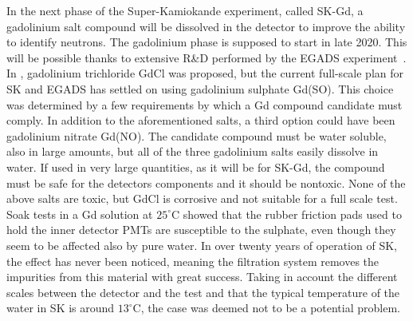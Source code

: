 In the next phase of the Super-Kamiokande experiment, called SK-Gd, a gadolinium salt compound %
will be dissolved in the detector to improve the ability to identify neutrons.
The gadolinium phase is supposed to start in late 2020.
This will be possible thanks to extensive R\&D performed by the EGADS experiment~\cite{Ikeda:2019pcm}.
In , gadolinium trichloride GdCl was proposed, %
but the current full-scale plan for SK and EGADS has settled on using gadolinium sulphate Gd(SO).
This choice was determined by a few requirements by which a Gd compound candidate must comply.
In addition to the aforementioned salts, a third option could have been gadolinium nitrate Gd(NO).
The candidate compound must be water soluble, also in large amounts, but all of the three gadolinium salts %
easily dissolve in water.
If used in very large quantities, as it will be for SK-Gd, the compound must be safe for %
the detectors components and it should be nontoxic. %
None of the above salts are toxic, but GdCl is corrosive and not suitable for a full scale test.
Soak tests in a Gd solution at $25^\circ$C showed that the rubber friction pads used to hold the inner detector PMTs %
are susceptible to the sulphate, even though they seem to be affected also by pure water.
In over twenty years of operation of SK, the effect has never been noticed, meaning the filtration system %
removes the impurities from this material with great success.
Taking in account the different scales between the detector and the test and that the typical temperature %
of the water in SK is around $13^\circ$C, the case was deemed not to be a potential problem.
